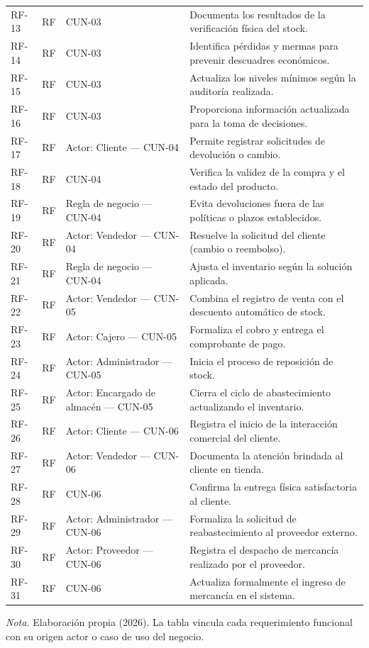 \begin{longtable}{|L{1.4cm}|C{1.1cm}|L{4.1cm}|L{8.1cm}|}
  RF-13 & RF & CUN-03 & Documenta los resultados de la verificación física del stock. \\
  RF-14 & RF & CUN-03 & Identifica pérdidas y mermas para prevenir descuadres económicos. \\
  RF-15 & RF & CUN-03 & Actualiza los niveles mínimos según la auditoría realizada. \\
  RF-16 & RF & CUN-03 & Proporciona información actualizada para la toma de decisiones. \\
  RF-17 & RF & Actor: Cliente --- CUN-04 & Permite registrar solicitudes de devolución o cambio. \\
  RF-18 & RF & CUN-04 & Verifica la validez de la compra y el estado del producto. \\
  RF-19 & RF & Regla de negocio --- CUN-04 & Evita devoluciones fuera de las políticas o plazos establecidos. \\
  RF-20 & RF & Actor: Vendedor --- CUN-04 & Resuelve la solicitud del cliente (cambio o reembolso). \\
  RF-21 & RF & Regla de negocio --- CUN-04 & Ajusta el inventario según la solución aplicada. \\
  RF-22 & RF & Actor: Vendedor --- CUN-05 & Combina el registro de venta con el descuento automático de stock. \\
  RF-23 & RF & Actor: Cajero --- CUN-05 & Formaliza el cobro y entrega el comprobante de pago. \\
  RF-24 & RF & Actor: Administrador --- CUN-05 & Inicia el proceso de reposición de stock. \\
  RF-25 & RF & Actor: Encargado de almacén --- CUN-05 & Cierra el ciclo de abastecimiento actualizando el inventario. \\
  RF-26 & RF & Actor: Cliente --- CUN-06 & Registra el inicio de la interacción comercial del cliente. \\
  RF-27 & RF & Actor: Vendedor --- CUN-06 & Documenta la atención brindada al cliente en tienda. \\
  RF-28 & RF & CUN-06 & Confirma la entrega física satisfactoria al cliente. \\
  RF-29 & RF & Actor: Administrador --- CUN-06 & Formaliza la solicitud de reabastecimiento al proveedor externo. \\
  RF-30 & RF & Actor: Proveedor --- CUN-06 & Registra el despacho de mercancía realizado por el proveedor. \\
  RF-31 & RF & CUN-06 & Actualiza formalmente el ingreso de mercancía en el sistema. \\
  \hline
\end{longtable}
\par\vspace{1ex}
\raggedright\noindent\small\emph{Nota.} Elaboración propia (2026). La tabla vincula cada requerimiento funcional con su origen actor o caso de uso del negocio.
\endgroup
